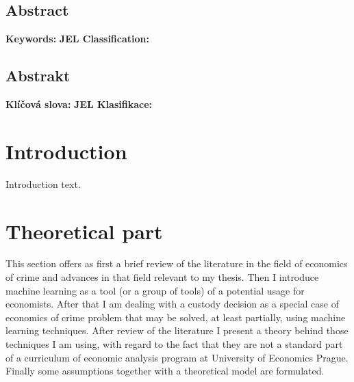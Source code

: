 \documentclass[12pt, twoside,openany]{book} %
\renewcommand{\baselinestretch}{1.5}
\begin{document}
\section*{Abstract}   %
\textbf{Keywords:} \newline
\textbf{JEL Classification:}


\section*{Abstrakt}
\textbf{Klíčová slova:} \newline
\textbf{JEL Klasifikace:}

\tableofcontents    %
\renewcommand{\thepage}{\arabic{page}}
\renewcommand{\baselinestretch}{1.5}


\chapter*{Introduction}     %
\pagestyle{plain}
Introduction text.


\chapter{Theoretical part}    %
This section offers as first a brief review of the literature in the field of economics of crime and advances in that field relevant to my thesis. Then I introduce machine learning as a tool (or a group of tools) of a potential usage for economists. After that I am dealing with a custody decision as a special case of economics of crime problem that may be solved, at least partially, using machine learning techniques.\newline
After review of the literature I present a theory behind those techniques I am using, with regard to the fact that they are not a standard part of a curriculum of economic analysis program at University of Economics Prague. Finally some assumptions together with a theoretical model are formulated. 
\end{document}
